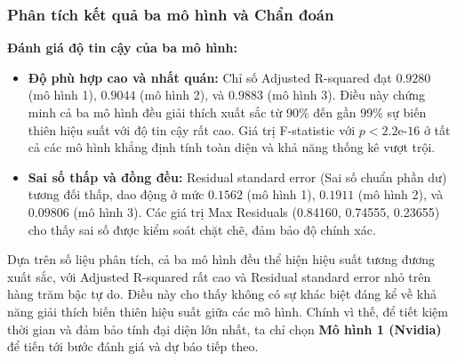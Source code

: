 \subsubsection{Phân tích kết quả ba mô hình và Chẩn đoán}

\textbf{Đánh giá độ tin cậy của ba mô hình:}
\begin{itemize}
    \item \textbf{Độ phù hợp cao và nhất quán:} Chỉ số Adjusted R-squared đạt $0.9280$ (mô hình 1), $0.9044$ (mô hình 2), và $0.9883$ (mô hình 3). Điều này chứng minh cả ba mô hình đều giải thích xuất sắc từ 90\% đến gần 99\% sự biến thiên hiệu suất với độ tin cậy rất cao. Giá trị F-statistic với $p < 2.2\text{e-}16$ ở tất cả các mô hình khẳng định tính toàn diện và khả năng thống kê vượt trội.
    \item \textbf{Sai số thấp và đồng đều:} Residual standard error (Sai số chuẩn phần dư) tương đối thấp, dao động ở mức $0.1562$ (mô hình 1), $0.1911$ (mô hình 2), và $0.09806$ (mô hình 3). Các giá trị Max Residuals (0.84160, 0.74555, 0.23655) cho thấy sai số được kiểm soát chặt chẽ, đảm bảo độ chính xác.
\end{itemize}

Dựa trên số liệu phân tích, cả ba mô hình đều thể hiện hiệu suất tương đương xuất sắc, với Adjusted R-squared rất cao và Residual standard error nhỏ trên hàng trăm bậc tự do. Điều này cho thấy không có sự khác biệt đáng kể về khả năng giải thích biến thiên hiệu suất giữa các mô hình. Chính vì thế, để tiết kiệm thời gian và đảm bảo tính đại diện lớn nhất, ta chỉ chọn \textbf{Mô hình 1 (Nvidia)} để tiến tới bước đánh giá và dự báo tiếp theo.
